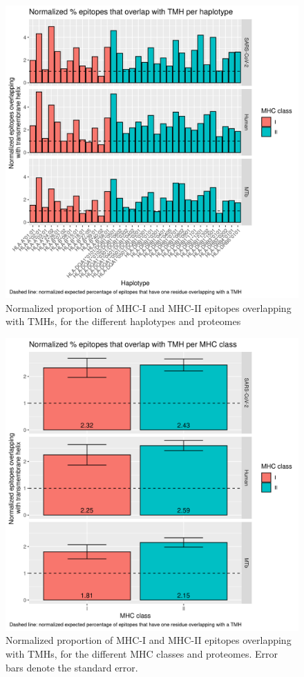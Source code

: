 \begin{figure}[!htbp]
  \includegraphics[width=\textwidth]{bbbq_1_smart_results/fig_rel_presentation_per_haplotype.png}
  \caption{
    Normalized proportion of MHC-I and MHC-II epitopes overlapping with TMHs,
    for the different haplotypes and proteomes
  }
  \label{fig:rel_presentation_per_haplotype}
\end{figure}

\begin{figure}[!htbp]
  \includegraphics[width=\textwidth]{bbbq_1_smart_results/fig_rel_presentation.png}
  \caption{
    Normalized proportion of MHC-I and MHC-II epitopes overlapping with TMHs,
    for the different MHC classes and proteomes. Error bars denote the
    standard error.
  }
  \label{fig:rel_presentation}
\end{figure}

